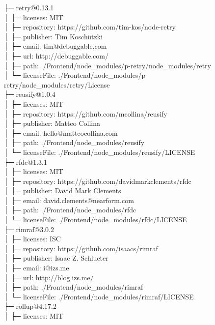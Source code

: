 \documentclass[
    paper=a4,
    twoside=false,
    parskip=half,
    listof=entryprefix,
    listof=totoc,
    index=totoc,
    bibliography=totoc,
    headsepline,
]{scrbook}
\begin{document}
    ├─ retry@0.13.1\\
    │  ├─ licenses: MIT\\
    │  ├─ repository: https://github.com/tim-kos/node-retry\\
    │  ├─ publisher: Tim Koschützki\\
    │  ├─ email: tim@debuggable.com\\
    │  ├─ url: http://debuggable.com/\\
    │  ├─ path: ./Frontend/node\_modules/p-retry/node\_modules/retry\\
    │  └─ licenseFile: ./Frontend/node\_modules/p-retry/node\_modules/retry/License\\
    ├─ reusify@1.0.4\\
    │  ├─ licenses: MIT\\
    │  ├─ repository: https://github.com/mcollina/reusify\\
    │  ├─ publisher: Matteo Collina\\
    │  ├─ email: hello@matteocollina.com\\
    │  ├─ path: ./Frontend/node\_modules/reusify\\
    │  └─ licenseFile: ./Frontend/node\_modules/reusify/LICENSE\\
    ├─ rfdc@1.3.1\\
    │  ├─ licenses: MIT\\
    │  ├─ repository: https://github.com/davidmarkclements/rfdc\\
    │  ├─ publisher: David Mark Clements\\
    │  ├─ email: david.clements@nearform.com\\
    │  ├─ path: ./Frontend/node\_modules/rfdc\\
    │  └─ licenseFile: ./Frontend/node\_modules/rfdc/LICENSE\\
    ├─ rimraf@3.0.2\\
    │  ├─ licenses: ISC\\
    │  ├─ repository: https://github.com/isaacs/rimraf\\
    │  ├─ publisher: Isaac Z. Schlueter\\
    │  ├─ email: i@izs.me\\
    │  ├─ url: http://blog.izs.me/\\
    │  ├─ path: ./Frontend/node\_modules/rimraf\\
    │  └─ licenseFile: ./Frontend/node\_modules/rimraf/LICENSE\\
    ├─ rollup@4.17.2\\
    │  ├─ licenses: MIT\\
\end{document}
